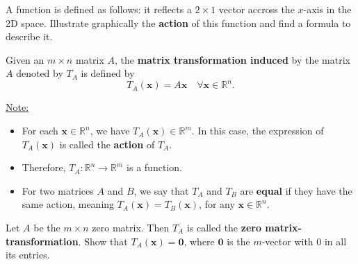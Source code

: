 \documentclass[20pt,a4paper]{extarticle}
\newcommand{\ra}{\rightarrow}
\newcounter{example}[section]
\newcounter{definition}[section]
\begin{document}
\begin{example}
A function is defined as follows: it reflects a $2 \times 1$ vector accross the $x$-axis in the 2D space. Illustrate graphically the \textbf{action} of this function and find a formula to describe it.
\end{example}

\begin{solution}

\end{solution}

\newpage

\begin{definition}
Given an $m \times n$ matrix $A$, the \textbf{matrix transformation induced} by the matrix $A$ denoted by $T_A$ is defined by
	\[
		T_A (\mathbf{x} ) = A \mathbf{x} \quad \forall \mathbf{x} \in \mathbb{R}^n .
	\]
\end{definition}

\underline{Note:}
	\begin{itemize}
		\item For each $\mathbf{x} \in \mathbb{R}^n$, we have $T_A (\mathbf{x}) \in \mathbb{R}^m$. In this case, the expression of $T_A (\mathbf{x})$ is called the \textbf{action} of $T_A$.
		\item Therefore, $T_A : \mathbb{R}^n \ra \mathbb{R}^m$ is a function. 
		\item For two matrices $A$ and $B$, we say that $T_A$ and $T_B$ are \textbf{equal} if they have the same action, meaning $T_A (\mathbf{x}) = T_B (\mathbf{x})$, for any $\mathbf{x} \in \mathbb{R}^n$.
	\end{itemize}


\begin{example}
Let $A$ be the $m \times n$ zero matrix. Then $T_A$ is called the \textbf{zero matrix-transformation}. Show that $T_A (\mathbf{x}) = \mathbf{0}$, where $\mathbf{0}$ is the $m$-vector with $0$ in all its entries.
\end{example}

\begin{solution}

\end{solution}
\end{document}
